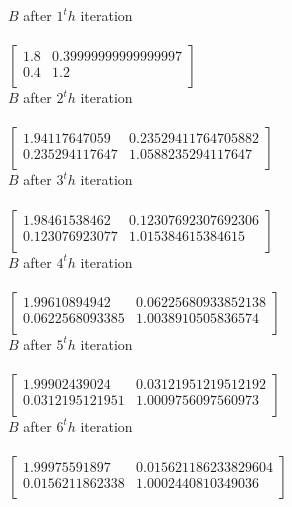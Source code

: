 \documentclass[12pt]{article}
\begin{document}
$B$ after $1^th$ iteration \\
\\
$
\left[ {\begin{array}{cc}
1.8 & 0.39999999999999997 \\
0.4 & 1.2 \\
\end{array} } \right]
$
\\
$B$ after $2^th$ iteration \\
\\
$
\left[ {\begin{array}{cc}
1.94117647059 & 0.23529411764705882 \\
0.235294117647 & 1.0588235294117647 \\
\end{array} } \right]
$
\\
$B$ after $3^th$ iteration \\
\\
$
\left[ {\begin{array}{cc}
1.98461538462 & 0.12307692307692306 \\
0.123076923077 & 1.015384615384615 \\
\end{array} } \right]
$
\\
$B$ after $4^th$ iteration \\
\\
$
\left[ {\begin{array}{cc}
1.99610894942 & 0.06225680933852138 \\
0.0622568093385 & 1.0038910505836574 \\
\end{array} } \right]
$
\\
$B$ after $5^th$ iteration \\
\\
$
\left[ {\begin{array}{cc}
1.99902439024 & 0.03121951219512192 \\
0.0312195121951 & 1.0009756097560973 \\
\end{array} } \right]
$
\\
$B$ after $6^th$ iteration \\
\\
$
\left[ {\begin{array}{cc}
1.99975591897 & 0.015621186233829604 \\
0.0156211862338 & 1.0002440810349036 \\
\end{array} } \right]
$
\end{document}
